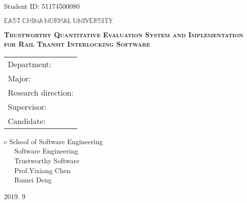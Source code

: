 \newpage

\pagestyle{empty}

\hspace*{\fill} {\large Student ID: 51174500080}

\vskip 2cm

\begin{center}
{\Huge $\mathbb{EAST}\,\mathbb{CHINA}\,\mathbb{NORMAL}\,
\mathbb{UNIVERSITY}$}
\end{center}

\vskip 3cm

\begin{center}
\bfseries{\scshape{\huge Trustworthy Quantitative Evaluation System and Implementation for Rail Transit Interlocking Software}}\\
\end{center}

\vskip 2cm {\large
\begin{center}
\begin{tabular}{l}
Department:\\
Major:\\
Research direction:\\
Supervisor:\\
Candidate:
\end{tabular}
\begin{tabular}c
\normalsize{School of Software Engineering}\\
\hline ~~~Software Engineering    \\
\hline ~~~Trustworthy Software\\
\hline ~~~Prof.Yixiang Chen \\
\hline ~~~Rumei Deng \\
\hline
\end{tabular}
\end{center}}

\vskip 30mm

\begin{center}
{\Large 2019. 9}
\end{center}
